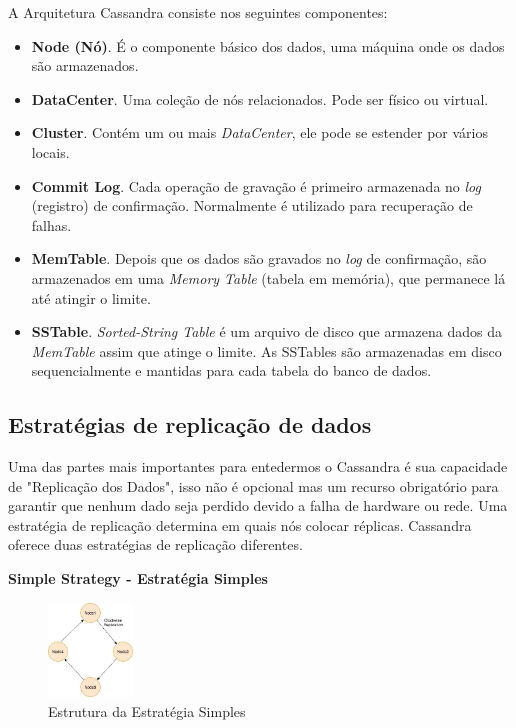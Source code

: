 \documentclass[a4paper,11pt]{article}
\begin{document}
A Arquitetura Cassandra consiste nos seguintes componentes:
\begin{itemize}[nolistsep]
	\item \textbf{Node (Nó)}. É o componente básico dos dados, uma máquina onde os dados são armazenados.
	\item \textbf{DataCenter}. Uma coleção de nós relacionados. Pode ser físico ou virtual.
	\item \textbf{Cluster}. Contém um ou mais \textit{DataCenter}, ele pode se estender por vários locais.
	\item \textbf{Commit Log}. Cada operação de gravação é primeiro armazenada no \textit{log} (registro) de confirmação. Normalmente é utilizado para recuperação de falhas. 
	\item \textbf{MemTable}. Depois que os dados são gravados no \textit{log} de confirmação, são armazenados em uma \textit{Memory Table} (tabela em memória), que permanece lá até atingir o limite.
	\item \textbf{SSTable}. \textit{Sorted-String Table} é um arquivo de disco que armazena dados da \textit{MemTable} assim que atinge o limite. As SSTables são armazenadas em disco sequencialmente e mantidas para cada tabela do banco de dados. 
\end{itemize}

\subsection{Estratégias de replicação de dados}
Uma das partes mais importantes para entedermos o Cassandra é sua capacidade de "Replicação dos Dados", isso não é opcional mas um recurso obrigatório para garantir que nenhum dado seja perdido devido a falha de hardware ou rede. Uma estratégia de replicação determina em quais nós colocar réplicas. Cassandra oferece duas estratégias de replicação diferentes.

\textbf{Simple Strategy - Estratégia Simples}
\begin{figure}[H]
	\centering
	\includegraphics[width=0.2\textwidth]{imagens/simpleStrategy.jpg}
	\caption{Estrutura da Estratégia Simples}
\end{figure}
\end{document}
